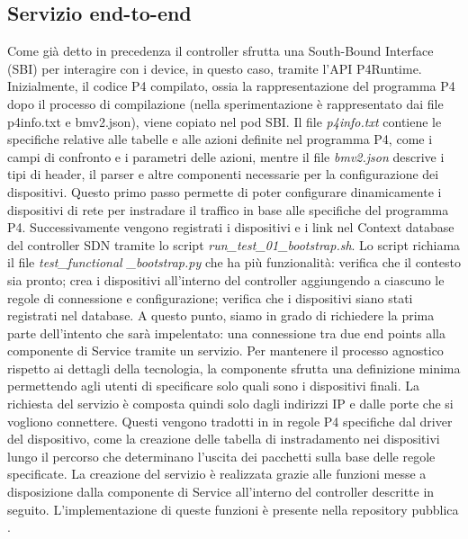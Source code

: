 \subsection{Servizio end-to-end}
Come già detto in precedenza il controller sfrutta una South-Bound Interface (SBI) per interagire con i device, in questo caso, tramite l'API P4Runtime. 
Inizialmente, il codice P4 compilato, ossia la rappresentazione del programma P4 dopo il processo di compilazione (nella sperimentazione è rappresentato dai file p4info.txt e bmv2.json),
viene copiato nel pod SBI.
Il file \textit{p4info.txt} contiene le specifiche relative alle tabelle e alle azioni definite nel programma P4, come i campi di confronto e i parametri delle azioni,
mentre il file \textit{bmv2.json} descrive i tipi di header, il parser e altre componenti necessarie per la configurazione dei dispositivi.
Questo primo passo permette di poter configurare dinamicamente i dispositivi di rete per instradare il traffico in base alle specifiche del programma P4.
\newline Successivamente vengono registrati i dispositivi e i link nel Context database del controller SDN tramite lo script \textit{run\_test\_01\_bootstrap.sh}.
Lo script richiama il file \textit{test\_functional \_bootstrap.py} che ha più funzionalità: verifica che il contesto sia pronto; crea i dispositivi all'interno del controller aggiungendo a ciascuno le regole di connessione e configurazione; verifica che i dispositivi siano stati registrati nel database.
A questo punto, siamo in grado di richiedere la prima parte dell'intento che sarà impelentato: una connessione tra due end points alla componente di Service tramite un servizio.
\newline Per mantenere il processo agnostico rispetto ai dettagli della tecnologia, la componente  
sfrutta una definizione minima permettendo agli utenti di specificare solo quali sono i dispositivi finali.
La richiesta del servizio è composta quindi solo dagli indirizzi IP e dalle porte che si vogliono connettere.
Questi vengono tradotti in 
in regole P4 specifiche dal driver del dispositivo, come la creazione delle tabella di instradamento nei dispositivi lungo il percorso che determinano l'uscita dei pacchetti sulla 
base delle regole specificate.
\newline La creazione del servizio è realizzata grazie alle funzioni messe a disposizione dalla componente di Service all'interno del controller descritte in seguito. 
L'implementazione di queste funzioni è presente nella repository pubblica \cite{servserv}.
